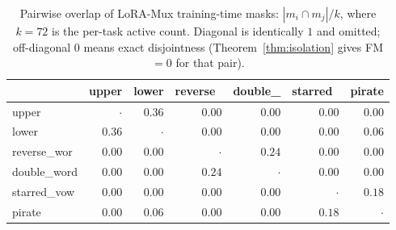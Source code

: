 \begin{table}[t]
\caption{Pairwise overlap of LoRA-Mux training-time masks: $|m_i\cap m_j|/k$, where $k=72$ is the per-task active count. Diagonal is identically $1$ and omitted; off-diagonal $0$ means exact disjointness (Theorem~\ref{thm:isolation} gives FM$=0$ for that pair).}
\label{tab:lora_overlap}
\vskip 0.05in
\begin{center}\begin{small}
\begin{tabular}{lrrrrrr}
\toprule
 & upper & lower & reverse\ & double\_ & starred\ & pirate \\
\midrule
upper & $\cdot$ & $0.36$ & $0.00$ & $0.00$ & $0.00$ & $0.00$ \\
lower & $0.36$ & $\cdot$ & $0.00$ & $0.00$ & $0.00$ & $0.06$ \\
reverse\_wor & $0.00$ & $0.00$ & $\cdot$ & $0.24$ & $0.00$ & $0.00$ \\
double\_word & $0.00$ & $0.00$ & $0.24$ & $\cdot$ & $0.00$ & $0.00$ \\
starred\_vow & $0.00$ & $0.00$ & $0.00$ & $0.00$ & $\cdot$ & $0.18$ \\
pirate & $0.00$ & $0.06$ & $0.00$ & $0.00$ & $0.18$ & $\cdot$ \\
\bottomrule
\end{tabular}
\end{small}\end{center}
\vskip -0.1in
\end{table}
